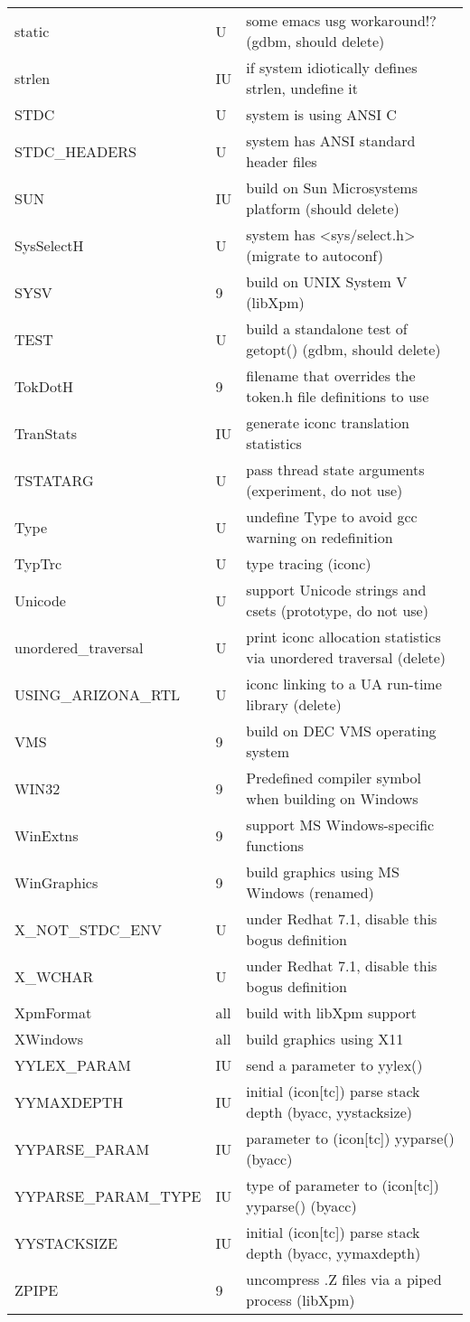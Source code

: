 \begin{xtabular}{|m{1.8in}|m{0.5in}|m{4.0in}|}
static & U & some emacs usg workaround!? (gdbm, should delete) \\
strlen & IU & if system idiotically defines strlen, undefine it \\
STDC & U & system is using ANSI C \\
STDC\_HEADERS & U & system has ANSI standard header files \\
SUN & IU & build on Sun Microsystems platform (should delete) \\
SysSelectH & U & system has <sys/select.h> (migrate to autoconf) \\
SYSV & 9 & build on UNIX System V (libXpm) \\
TEST & U & build a standalone test of getopt() (gdbm, should delete) \\
TokDotH & 9 & filename that overrides the token.h file definitions to use \\
TranStats & IU & generate iconc translation statistics \\
TSTATARG & U & pass thread state arguments (experiment, do not use) \\
Type & U & undefine Type to avoid gcc warning on redefinition \\
TypTrc & U & type tracing (iconc) \\
Unicode & U & support Unicode strings and csets (prototype, do not use) \\
unordered\_traversal & U & print iconc allocation statistics via unordered traversal (delete) \\
USING\_ARIZONA\_RTL & U & iconc linking to a UA run-time library (delete) \\
VMS & 9 & build on DEC VMS operating system \\
WIN32 & 9 & Predefined compiler symbol when building  on Windows \\
WinExtns & 9 & support MS Windows-specific functions \\
WinGraphics & 9 & build graphics using MS Windows (renamed) \\
X\_NOT\_STDC\_ENV & U & under Redhat 7.1, disable this bogus definition \\
X\_WCHAR & U & under Redhat 7.1, disable this bogus definition \\
XpmFormat & all & build with libXpm support \\
XWindows & all & build graphics using X11 \\
YYLEX\_PARAM & IU & send a parameter to yylex() \\
YYMAXDEPTH & IU & initial (icon[tc]) parse stack depth (byacc, yystacksize) \\
YYPARSE\_PARAM & IU & parameter to (icon[tc]) yyparse() (byacc) \\
YYPARSE\_PARAM\_TYPE & IU & type of parameter to (icon[tc]) yyparse() (byacc) \\
YYSTACKSIZE & IU & initial (icon[tc]) parse stack depth (byacc, yymaxdepth) \\
ZPIPE & 9 & uncompress .Z files via a piped process (libXpm) \\
\hline
\end{xtabular}
